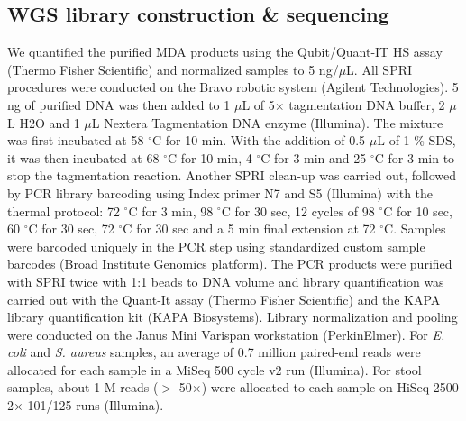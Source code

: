 \subsection{WGS library construction \& sequencing}
We quantified the purified MDA products using the Qubit\slash Quant-IT HS assay (Thermo Fisher Scientific) and normalized samples to 5 ng\slash $\mu$L. All SPRI procedures were conducted on the Bravo robotic system (Agilent Technologies). 5 ng of purified DNA was then added to 1 $\mu$L of 5$\times$ tagmentation DNA buffer, 2 $\mu$L H2O and 1 $\mu$L Nextera Tagmentation DNA enzyme (Illumina). The mixture was first incubated at 58 $^{\circ}$C for 10 min. With the addition of 0.5 $\mu$L of 1 \% SDS, it was then incubated at 68 $^{\circ}$C for 10 min, 4 $^{\circ}$C for 3 min and 25 $^{\circ}$C for 3 min to stop the tagmentation reaction. Another SPRI clean-up was carried out, followed by PCR library barcoding using Index primer N7 and S5 (Illumina) with the thermal protocol: 72 $^{\circ}$C for 3 min, 98 $^{\circ}$C for 30 sec, 12 cycles of 98 $^{\circ}$C for 10 sec, 60 $^{\circ}$C for 30 sec, 72 $^{\circ}$C for 30 sec and a 5 min final extension at 72 $^{\circ}$C. Samples were barcoded uniquely in the PCR step using standardized custom sample barcodes (Broad Institute Genomics platform). The PCR products were purified with SPRI twice with 1:1 beads to DNA volume and library quantification was carried out with the Quant-It assay (Thermo Fisher Scientific) and the KAPA library quantification kit (KAPA Biosystems). Library normalization and pooling were conducted on the Janus Mini Varispan workstation (PerkinElmer). For \textit{E. coli} and \textit{S. aureus} samples, an average of 0.7 million paired-end reads were allocated for each sample in a MiSeq 500 cycle v2 run (Illumina). For stool samples, about 1 M reads ($>$ 50$\times$) were allocated to each sample on HiSeq 2500 2$\times$ 101\slash 125 runs (Illumina). 

